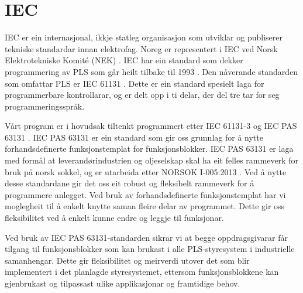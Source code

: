 \section{IEC}
\thispagestyle{fancy}
\label{sec:5.2}


\gls{IEC} \citep{IEC} er ein internasjonal, ikkje statleg organisasjon som utviklar og publiserer tekniske standardar innan elektrofag. 
Noreg er representert i \gls{IEC} ved Norsk Elektrotekniske Komité (\gls{NEK}) \citep{IEC-SNL}. 
\gls{IEC} har ein standard som dekker programmering av \gls{PLS} som går heilt tilbake til 1993 \citep{Wiki-93}. 
Den nåverande standarden som omfattar PLS er IEC 61131 \citep{IEC-61131}. Dette er ein standard spesielt laga for programmerbare kontrollarar, og er delt opp i ti delar, der del tre tar for seg programmeringsspråk. 

Vårt program er i hovudsak tiltenkt programmert etter \gls{IEC} 61131-3 og \gls{IEC} \gls{PAS} 63131 \citep{IEC-63131}. 
\Gls{IEC} \gls{PAS} 63131 er ein standard som gir oss grunnlag for å nytte forhandsdefinerte funksjonstemplat for funksjonsblokker. 
\gls{IEC} \gls{PAS} 63131 er laga med formål at leverandørindustrien og oljeselskap skal ha eit felles rammeverk for bruk på norsk sokkel, og er utarbeida etter NORSOK I-005:2013 \citep{NORSOK}.
Ved å nytte desse standardane gir det oss eit robust og fleksibelt rammeverk for å programmere anlegget. 
Ved bruk av forhandsdefinerte funksjonstemplat har vi moglegheit til å enkelt knytte saman fleire delar av programmet. 
Dette gir oss fleksibilitet ved å enkelt kunne endre og leggje til funksjonar.

Ved bruk av \gls{IEC} \gls{PAS} 63131-standarden sikrar vi at begge oppdragsgivarar får tilgang til funksjonsblokker 
som kan brukast i alle \gls{PLS}-styresystem i industrielle samanhengar. Dette gir fleksibilitet 
og meirverdi utover det som blir implementert i det planlagde styresystemet, 
ettersom funksjonsblokkene kan gjenbrukast og tilpassast ulike applikasjonar og framtidige behov.
\newpage

